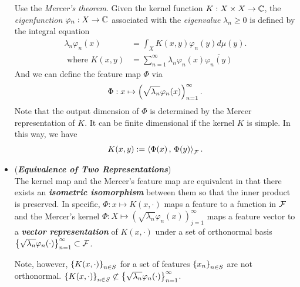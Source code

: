 \documentclass[11pt]{article}
\begin{document}
\begin{itemize}
\begin{remark}
 Use the \emph{Mercer's theorem}. Given the kernel function $K: X \times X \rightarrow {\mathbb C}$, the \emph{eigenfunction} $\varphi_n: X\rightarrow {\mathbb C}$ associated with the \emph{eigenvalue} $\lambda_n \ge 0$ is defined by the integral equation
\begin{align*}
\lambda_n \varphi_n(x) &= \int_{X}K(x, y) \varphi_n(y) d\mu(y).\\
\text{ where } K(x,y) &= \sum_{n=1}^{\infty}\lambda_{n}\varphi_n(x)\overline{\varphi_n(y)}
\end{align*}
And we can define the feature map $\Phi$ via
\begin{align*}
\Phi: x \mapsto \left(\sqrt{\lambda_{n}}\varphi_{n}(x)\right)_{n=1}^{\infty}.
\end{align*} Note that the output dimension of $\Phi$ is determined by the Mercer representation of $K$. It can be finite dimensional if the kernel $K$ is simple. In this way, we have 
\begin{align*}
K(x,y) := \left\langle \Phi(x)\,,\, \Phi(y) \right\rangle_{{\mathcal F}}.
\end{align*}
\end{remark}

\item \begin{remark} (\emph{\textbf{Equivalence of Two Representations}})\\
The kernel map and the Mercer's feature map are equivalent in that there exists an \emph{\textbf{isometric isomorphism}} between them so that the inner product is preserved. In specific, $\Phi: x \mapsto K(x, \cdot)$ maps a feature to a function in ${\mathcal F}$ and the Mercer's kernel  $\Phi: X \mapsto (\sqrt{\lambda_{n}}\varphi_{n}(x))_{j=1}^{\infty}$ maps a feature vector to a \emph{\textbf{vector representation}} of $K(x, \cdot)$ under a set of orthonormal basis $\left\{\sqrt{\lambda_{n}}\varphi_{n}(\cdot)\right\}_{n=1}^{\infty} \subset {\mathcal F}$.
 
Note, however, $\left\{K(x, \cdot)\right\}_{n\in S}$ for a set of features $\left\{x_{n}\right\}_{n\in S}$ are not orthonormal. $\left\{K(x, \cdot)\right\}_{n\in S}  \not\subset \left\{\sqrt{\lambda_{n}}\varphi_{n}(\cdot)\right\}_{n=1}^{\infty} $.
\end{remark}

\end{itemize}
\end{document}
